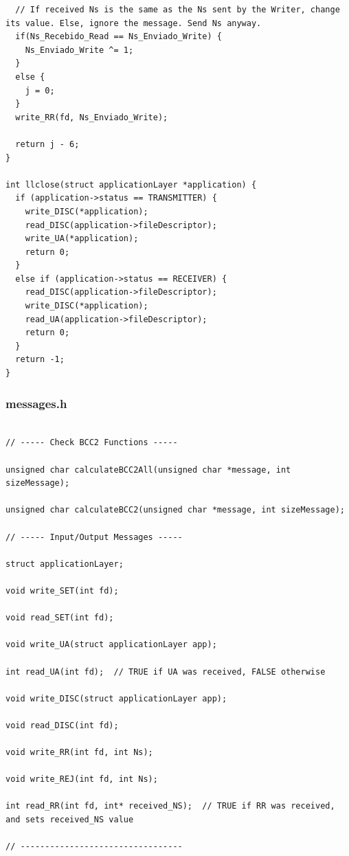 \documentclass[article, a4paper, 11pt, oneside]{memoir}
\begin{document}
\begin{lstlisting}
  // If received Ns is the same as the Ns sent by the Writer, change its value. Else, ignore the message. Send Ns anyway.
  if(Ns_Recebido_Read == Ns_Enviado_Write) {
    Ns_Enviado_Write ^= 1;
  }
  else {
    j = 0;
  }
  write_RR(fd, Ns_Enviado_Write);

  return j - 6;
}

int llclose(struct applicationLayer *application) {
  if (application->status == TRANSMITTER) {
    write_DISC(*application);
    read_DISC(application->fileDescriptor);
    write_UA(*application);
    return 0;
  }
  else if (application->status == RECEIVER) {
    read_DISC(application->fileDescriptor);
    write_DISC(*application);
    read_UA(application->fileDescriptor);
    return 0;
  }
  return -1;
}
\end{lstlisting}

\newpage
\subsubsection{messages.h}
\begin{lstlisting}
	
// ----- Check BCC2 Functions -----

unsigned char calculateBCC2All(unsigned char *message, int sizeMessage);

unsigned char calculateBCC2(unsigned char *message, int sizeMessage);

// ----- Input/Output Messages -----

struct applicationLayer;

void write_SET(int fd);

void read_SET(int fd);

void write_UA(struct applicationLayer app);

int read_UA(int fd);  // TRUE if UA was received, FALSE otherwise

void write_DISC(struct applicationLayer app);

void read_DISC(int fd);

void write_RR(int fd, int Ns);

void write_REJ(int fd, int Ns);

int read_RR(int fd, int* received_NS);  // TRUE if RR was received, and sets received_NS value

// ---------------------------------
\end{lstlisting}
\end{document}
